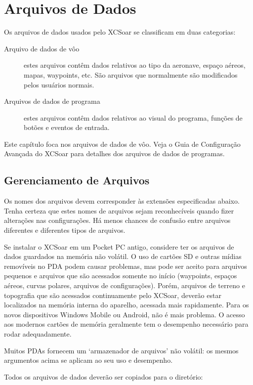 \chapter{Arquivos de Dados}\label{cha:data-files}

Os arquivos de dados usados pelo XCSoar se classificam em duas categorias:
\begin{description}
\item[Arquivo de dados de vôo]  estes arquivos contêm dados relativos ao tipo da aeronave, espaço aéreos, mapas, waypoints, etc.  São arquivos que normalmente são modificados pelos usuários normais.
\item[Arquivos de dados de programa]  estes arquivos contêm dados relativos ao visual do programa, funções de botões e eventos de entrada.  
\end{description}
Este capítulo foca nos arquivos de dados de vôo. Veja o Guia de Configuração Avançada do XCSoar para detalhes dos arquivos de dados de programas.
 

\section{Gerenciamento de Arquivos}

Os nomes dos arquivos devem corresponder às extensões especificadas abaixo.  Tenha certeza que estes nomes de arquivos sejam reconhecíveis quando fizer alterações nas configurações.  Há menos chances de confusão entre arquivos diferentes e diferentes tipos de arquivos.

Se instalar o XCSoar em um Pocket PC antigo, considere ter os arquivos de dados guardados na memória não volátil.  O uso de cartões SD e outras mídias removíveis no PDA podem causar problemas, mas pode ser aceito para arquivos pequenos e arquivos que são acessados somente no início (waypoints, espaços aéreos, curvas polares, arquivos de configurações).  Porém, arquivos de terreno e topografia que são acessados continuamente pelo XCSoar, deverão estar localizados na memória interna do aparelho, acessada mais rapidamente.  Para os novos dispositivos Windows Mobile ou Android, não é mais problema.  O acesso aos modernos cartões de memória geralmente tem o desempenho necessário para rodar adequadamente.

Muitos PDAs fornecem um ‘armazenador de arquivos’ não volátil: os mesmos argumentos acima se aplicam ao seu uso e desempenho.

Todos os arquivos de dados deverão ser copiados para o diretório: 

